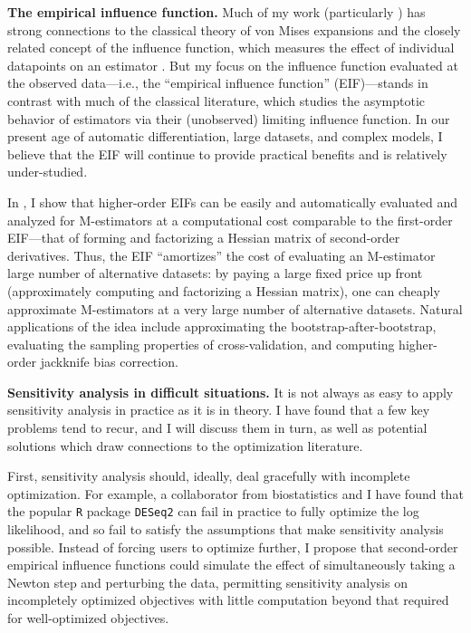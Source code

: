 \textbf{The empirical influence function.}
%
Much of my work (particularly \citet{giordano:2019:ij, giordano:2020:amip,
giordano:2021:bayesij}) has strong connections to the classical theory of von
Mises expansions and the closely related concept of the influence function,
which measures the effect of individual datapoints on an estimator
\citep{mises:1947:asymptotic, hampel:1986:robustbook,
serfling:2009:approximation}.  But my focus on the influence function
evaluated at the observed data---i.e., the ``empirical influence function''
(EIF)---stands in contrast with much of the classical literature, which studies
the asymptotic behavior of estimators via their (unobserved) limiting influence
function.
%
In our present age of automatic differentiation, large datasets, and complex
models, I believe that the EIF will continue to provide practical benefits and
is relatively under-studied.

In \citet{giordano:2019:hoij}, I show that higher-order EIFs can be
easily and automatically evaluated and analyzed for M-estimators at a
computational cost comparable to the first-order EIF---that of forming and
factorizing a Hessian matrix of second-order derivatives.
%
Thus, the EIF ``amortizes'' the cost of evaluating an M-estimator large number
of alternative datasets: by paying a large fixed price up front (approximately
computing and factorizing a Hessian matrix), one can cheaply approximate
M-estimators at a very large number of alternative datasets.  Natural
applications of the idea include approximating the bootstrap-after-bootstrap,
evaluating the sampling properties of cross-validation, and computing
higher-order jackknife bias correction.


\textbf{Sensitivity analysis in difficult situations.}
%
It is not always as easy to apply sensitivity analysis in practice as it is in
theory.  I have found that a few key problems tend to recur, and I will discuss
them in turn, as well as potential solutions which draw connections to the
optimization literature.

First, sensitivity analysis should, ideally, deal gracefully with incomplete
optimization.  For example, a collaborator from biostatistics and I have found
that the popular \texttt{R} package \texttt{DESeq2} can fail in practice to
fully optimize the log likelihood, and so fail to satisfy the assumptions that
make sensitivity analysis possible.  Instead of forcing users to optimize
further, I propose that second-order empirical influence functions could
simulate the effect of simultaneously taking a Newton step and perturbing the
data, permitting sensitivity analysis on incompletely optimized objectives with
little computation beyond that required for well-optimized objectives.

